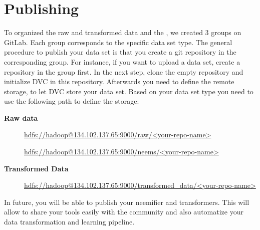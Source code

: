 \section{Publishing}
To organized the raw and transformed data and the \neems, we created 3 groups on GitLab.
Each group corresponds to the specific data set type.
The general procedure to publish your data set is that you create a git repository in the corresponding group.
For instance, if you want to upload a \neem data set, create a repository in the \neem group first.
In the next step, clone the empty repository and initialize DVC in this repository.
Afterwards you need to define the remote storage, to let DVC store your data set.
Based on your data set type you need to use the following path to define the storage:
 
\begin{description}
	\item[\textbf{Raw data}]\leavevmode \newline
		\url{hdfs://hadoop@134.102.137.65:9000/raw/<your-repo-name>}
	\item[\textbf{\neems}] \leavevmode \newline
		\url{hdfs://hadoop@134.102.137.65:9000/neems/<your-repo-name>}
	\item[\textbf{Transformed Data}] \leavevmode \newline
		\url{hdfs://hadoop@134.102.137.65:9000/transformed_data/<your-repo-name>}
\end{description}

In future, you will be able to publish your neemifier and transformers.
This will allow to share your tools easily with the community and also automatize your data transformation and learning pipeline.

